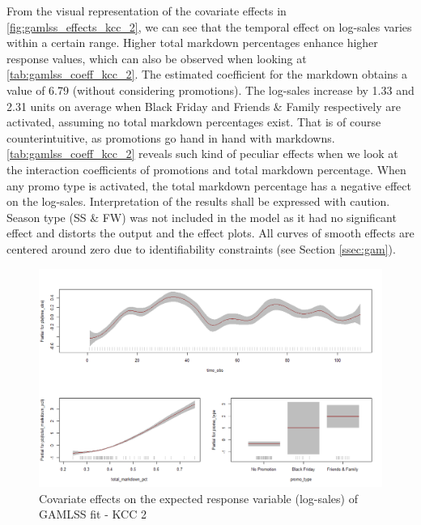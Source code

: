 From the visual representation of the covariate effects in \autoref{fig:gamlss_effects_kcc_2}, we can see that the temporal effect on log-sales varies within a certain range.
Higher total markdown percentages enhance higher response values, which can also be observed when looking at \autoref{tab:gamlss_coeff_kcc_2}. The estimated coefficient for the markdown obtains a value of 6.79 (without considering promotions). The log-sales increase by 1.33 and 2.31 units on average when Black Friday and Friends \& Family respectively are activated, assuming no total markdown percentages exist. That is of course counterintuitive, as promotions go hand in hand with markdowns. \autoref{tab:gamlss_coeff_kcc_2} reveals such kind of peculiar effects when we look at the interaction coefficients of promotions and total markdown percentage. When any promo type is activated, the total markdown percentage has a negative effect on the log-sales. Interpretation of the results shall be expressed with caution. Season type (SS \& FW) was not included in the model as it had no significant effect and distorts the output and the effect plots. All curves of smooth effects are centered around zero due to identifiability constraints (see Section \ref{ssec:gam}).
\\




\begin{figure}[H]
\centering
  \includegraphics[width=0.95\linewidth]{figures/gamlss_effects_kcc_2.png}
  \caption{Covariate effects on the expected response variable (log-sales) of GAMLSS fit - KCC 2}
  \label{fig:gamlss_effects_kcc_2}
\end{figure}





